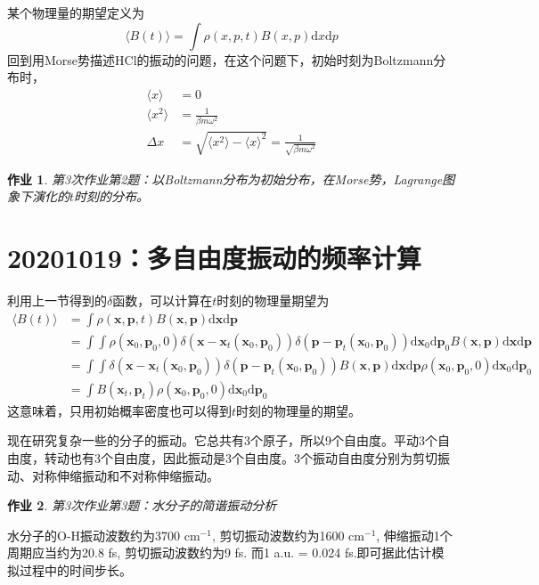 \documentclass[12pt]{article}
\newtheorem{asg}{作业}
\begin{document}
    某个物理量的期望定义为
    \begin{equation}
        \langle B(t) \rangle = \int \rho(x,p,t) B(x,p) \mathrm{d}x\mathrm{d}p
    \end{equation}
    回到用Morse势描述HCl的振动的问题，在这个问题下，初始时刻为Boltzmann分布时，
    \begin{equation}\begin{aligned}
        \langle x \rangle &= 0\\
        \langle x^2 \rangle &= \frac 1{\beta m \omega^2}\\
        \Delta x &= \sqrt{\langle x^2 \rangle - \langle x \rangle ^2} = \frac 1{\sqrt{\beta m \omega^2}}
    \end{aligned}\end{equation}

    \begin{asg}
        第3次作业第2题：以Boltzmann分布为初始分布，在Morse势，Lagrange图象下演化的$t$时刻的分布。
    \end{asg}

\section{20201019：多自由度振动的频率计算}

    利用上一节得到的$\delta$函数，可以计算在$t$时刻的物理量期望为
    \begin{equation}\begin{aligned}
        \langle B(t) \rangle &= \int \rho(\bm{x},\bm{p},t) B(\bm{x},\bm{p}) \mathrm{d}\bm{x}\mathrm{d}\bm{p}\\
        &= \int \int \rho(\bm{x}_0,\bm{p}_0,0)\delta(\bm{x}-\bm{x}_t(\bm{x}_0,\bm{p}_0)) \delta(\bm{p}-\bm{p}_t(\bm{x}_0,\bm{p}_0)) \mathrm{d}\bm{x}_0\mathrm{d}\bm{p}_0 B(\bm{x},\bm{p}) \mathrm{d}\bm{x}\mathrm{d}\bm{p}\\
        &= \int \int \delta(\bm{x}-\bm{x}_t(\bm{x}_0,\bm{p}_0)) \delta(\bm{p}-\bm{p}_t(\bm{x}_0,\bm{p}_0)) B(\bm{x},\bm{p}) \mathrm{d}\bm{x}\mathrm{d}\bm{p} \rho(\bm{x}_0,\bm{p}_0,0) \mathrm{d}\bm{x}_0\mathrm{d}\bm{p}_0\\
        &= \int B(\bm{x}_t,\bm{p}_t) \rho(\bm{x}_0,\bm{p}_0,0)\mathrm{d}\bm{x}_0\mathrm{d}\bm{p}_0
    \end{aligned}\end{equation}
    这意味着，只用初始概率密度也可以得到$t$时刻的物理量的期望。

    现在研究复杂一些的分子的振动。它总共有3个原子，所以9个自由度。平动3个自由度，转动也有3个自由度，因此振动是3个自由度。3个振动自由度分别为剪切振动、对称伸缩振动和不对称伸缩振动。
    \begin{asg}
        第3次作业第3题：水分子的简谐振动分析
    \end{asg}
    水分子的O-H振动波数约为3700 cm$^{-1}$, 剪切振动波数约为1600 cm$^{-1}$, 伸缩振动1个周期应当约为20.8 fs, 剪切振动波数约为9 fs. 而1 a.u. = 0.024 fs.即可据此估计模拟过程中的时间步长。
\end{document}
